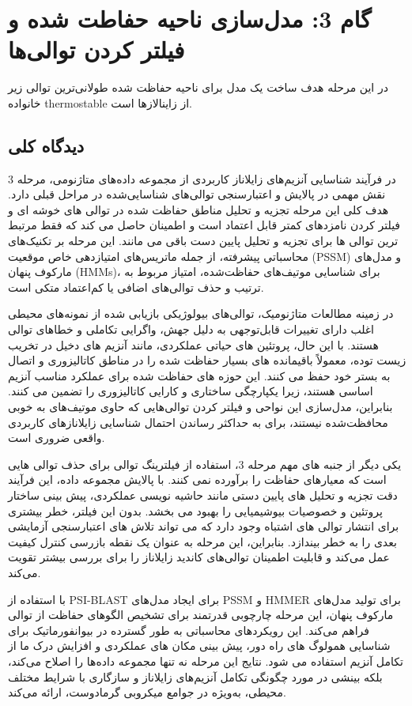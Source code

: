 \chapter{گام 3: مدل‌سازی ناحیه حفاطت شده و فیلتر کردن توالی‌ها }
            در این مرحله هدف ساخت یک مدل برای ناحیه حفاظت شده طولانی‌ترین توالی زیر خانواده thermostable از زاینالازها است.
        \section{دیدگاه کلی}
            در فرآیند شناسایی آنزیم‌های زایلاناز کاربردی از مجموعه داده‌های متاژنومی، مرحله 3 نقش مهمی در پالایش و اعتبارسنجی توالی‌های شناسایی‌شده در مراحل قبلی دارد. هدف کلی این مرحله تجزیه و تحلیل مناطق حفاظت شده در توالی های خوشه ای و فیلتر کردن نامزدهای کمتر قابل اعتماد است و اطمینان حاصل می کند که فقط مرتبط ترین توالی ها برای تجزیه و تحلیل پایین دست باقی می مانند. این مرحله بر تکنیک‌های محاسباتی پیشرفته، از جمله ماتریس‌های امتیازدهی خاص موقعیت (PSSM) و مدل‌های مارکوف پنهان (HMMs)، برای شناسایی موتیف‌های حفاظت‌شده، امتیاز مربوط به ترتیب و حذف توالی‌های اضافی یا کم‌اعتماد متکی است.

            در زمینه مطالعات متاژنومیک، توالی‌های بیولوژیکی بازیابی شده از نمونه‌های محیطی اغلب دارای تغییرات قابل‌توجهی به دلیل جهش، واگرایی تکاملی و خطاهای توالی هستند. با این حال، پروتئین های حیاتی عملکردی، مانند آنزیم های دخیل در تخریب زیست توده، معمولاً باقیمانده های بسیار حفاظت شده را در مناطق کاتالیزوری و اتصال به بستر خود حفظ می کنند. این حوزه های حفاظت شده برای عملکرد مناسب آنزیم اساسی هستند، زیرا یکپارچگی ساختاری و کارایی کاتالیزوری را تضمین می کنند. بنابراین، مدل‌سازی این نواحی و فیلتر کردن توالی‌هایی که حاوی موتیف‌های به خوبی محافظت‌شده نیستند، برای به حداکثر رساندن احتمال شناسایی زایلانازهای کاربردی واقعی ضروری است.

            یکی دیگر از جنبه های مهم مرحله 3، استفاده از فیلترینگ توالی برای حذف توالی هایی است که معیارهای حفاظت را برآورده نمی کنند. با پالایش مجموعه داده، این فرآیند دقت تجزیه و تحلیل های پایین دستی مانند حاشیه نویسی عملکردی، پیش بینی ساختار پروتئین و خصوصیات بیوشیمیایی را بهبود می بخشد. بدون این فیلتر، خطر بیشتری برای انتشار توالی های اشتباه وجود دارد که می تواند تلاش های اعتبارسنجی آزمایشی بعدی را به خطر بیندازد. بنابراین، این مرحله به عنوان یک نقطه بازرسی کنترل کیفیت عمل می‌کند و قابلیت اطمینان توالی‌های کاندید زایلاناز را برای بررسی بیشتر تقویت می‌کند.

            با استفاده از 
            PSI-BLAST 
            برای ایجاد مدل‌های 
            PSSM 
            و 
            HMMER 
            برای تولید مدل‌های مارکوف پنهان، این مرحله چارچوبی قدرتمند برای تشخیص الگوهای حفاظت از توالی فراهم می‌کند. این رویکردهای محاسباتی به طور گسترده در بیوانفورماتیک برای شناسایی همولوگ های راه دور، پیش بینی مکان های عملکردی و افزایش درک ما از تکامل آنزیم استفاده می شود. نتایج این مرحله نه تنها مجموعه داده‌ها را اصلاح می‌کند، بلکه بینشی در مورد چگونگی تکامل آنزیم‌های زایلاناز و سازگاری با شرایط مختلف محیطی، به‌ویژه در جوامع میکروبی گرمادوست، ارائه می‌کند.
